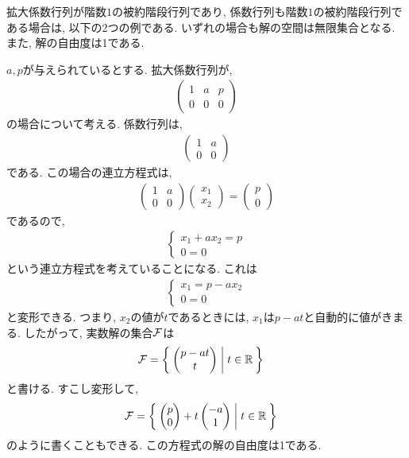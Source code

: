 拡大係数行列が階数$1$の被約階段行列であり,
係数行列も階数$1$の被約階段行列である場合は,
以下の2つの例である.
いずれの場合も解の空間は無限集合となる.
また, 解の自由度は1である.
\begin{example}
  \label{eg:eq:reduced:4}
  $a,p$が与えられているとする.
  拡大係数行列が,
  \begin{align*}
    \begin{pmatrix}
      1&a&p\\0&0&0
    \end{pmatrix}
  \end{align*}
  の場合について考える.
  係数行列は,
  \begin{align*}
    \begin{pmatrix}
      1&a\\0&0
    \end{pmatrix}
  \end{align*}
  である.
  この場合の連立方程式は,
  \begin{align*}
    \begin{pmatrix}
      1&a\\0&0
    \end{pmatrix}
    \begin{pmatrix}x_1\\x_2\end{pmatrix}
      =
      \begin{pmatrix}
        p\\0
      \end{pmatrix}
  \end{align*}
  であるので,
  \begin{align*}
    \begin{cases}
      x_1+ax_2=p\\
      0=0
    \end{cases}
  \end{align*}
  という連立方程式を考えていることになる.
  これは
  \begin{align*}
    \begin{cases}
      x_1=p-ax_2\\
      0=0
    \end{cases}
  \end{align*}
  と変形できる.
  つまり, $x_2$の値が$t$であるときには,
  $x_1$は$p-at$と自動的に値がきまる.
  したがって, 実数解の集合$\mathcal{F}$は
  \begin{align*}
    \mathcal{F}
    &=
    \Set{
      \begin{pmatrix}p-at\\t\end{pmatrix}
        |t\in\mathbb{R}}
  \end{align*}
  と書ける.  
  すこし変形して,
  \begin{align*}
    \mathcal{F}
    &=
    \Set{
      \begin{pmatrix}p\\0\end{pmatrix}
        +
        t\begin{pmatrix}-a\\1\end{pmatrix}
    |t\in\mathbb{R}}
  \end{align*}
  のように書くこともできる.
  この方程式の解の自由度は1である.
\end{example}


